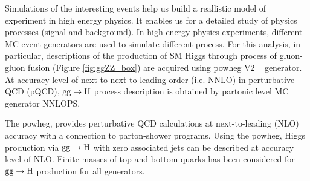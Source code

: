 Simulations of the interesting events help us build a reallistic model of experiment in high energy physics. It enables us for a detailed study of physics processes (signal and background). 
In high energy physics experiments, different MC event generators are used to simulate different process.
For this analysis, in particular, descriptions of the production of SM Higgs through 
process of gluon-gluon fusion (Figure \ref{fig:ggZZ_box}) 
are acquired using 
{\sc powheg V2} ~\cite{powheg, powhegvv} generator. %
At accuracy level of next-to-next-to-leading order (i.e. NNLO) in perturbative QCD (pQCD), ${\rm gg}\rightarrow{\rm H}$ process description %
is obtained by partonic level MC generator {\sc NNLOPS}. 

The {\sc powheg}, provides  perturbative QCD calculations at next-to-leading (NLO) accuracy with a connection to parton-shower programs. Using the {\sc powheg}, Higgs production via ${\rm gg}\rightarrow{\rm H}$ with zero associated jets can be described at accuracy level of NLO. 
Finite masses of top and bottom quarks has been considered for ${\rm gg}\rightarrow{\rm H}$ production for all generators. %
%

